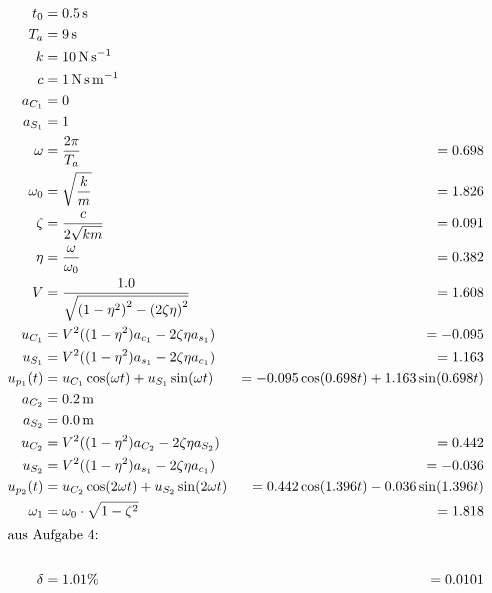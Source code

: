 \begin{solution}
    \begin{solution}  
        \begin{align*}
            t_0 &= \SI{0.5}{\second}\\
            T_a &= \SI{9}{\second} \\
            k &=  \SI{10}{\newton \per \second} \\
            c &= \SI{1}{\newton \second \per \meter} \\
            a_{C_1} &= 0 \\
            a_{S_1} &= 1 \\
            \omega &= \frac{2 \pi}{T_a} &= 0.698 \\
            \omega_0 &= \sqrt{\frac{k}{m}} &= 1.826\\
            \zeta &= \frac{c}{2 \sqrt{km}} &= 0.091\\
            \eta &= \frac{\omega}{\omega_0} &= 0.382\\
            V &= \frac{1.0}{\sqrt{{(1-\eta^2)}^2 - {(2 \zeta \eta)}^2}} &= 1.608\\
            u_{C_1}  &= V^2 ((1-\eta^2) a_{c_1} - 2 \zeta \eta a_{s_1}) &= -0.095 \\ 
            u_{S_1} &= V^2 ((1-\eta^2) a_{s_1} - 2 \zeta \eta a_{c_1}) &= 1.163 \\  
            u_{p_1}(t) &= u_{C_1} \cos(\omega t) + u_{S_1} \sin(\omega t) &= -0.095 \cos(0.698 t) + 1.163 \sin(0.698 t)\\
            a_{C_2} &= \SI{0.2}{\meter} \\
            a_{S_2} &= \SI{0.0}{\meter} \\
            u_{C_2} &= V^2 ((1-\eta^2) a_{C_2} - 2 \zeta \eta a_{S_2}) &= 0.442\\
            u_{S_2} &= V^2 ((1-\eta^2) a_{s_1} - 2 \zeta \eta a_{c_1}) &= -0.036\\
            u_{p_2}(t) &= u_{C_2} \cos(2\omega t) + u_{S_2} \sin(2\omega t) &= 0.442 \cos(1.396t) -0.036 \sin(1.396 t) \\
            \omega_1 &= \omega_0 \cdot \sqrt{1 - \zeta^2} &= 1.818\\
            \intertext{aus Aufgabe 4:} \\
            \delta &= 1.01 \% &= 0.0101\\
        \end{align*}
    \end{solution}
    

\end{solution}
